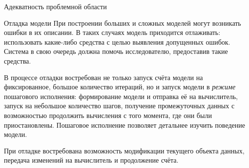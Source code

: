 \documentclass[a4paper,12pt]{extarticle}
\begin{document}
\begin{subsection}{Адекватность проблемной области}
    \begin{subsubsection}{Отладка модели}
        При построении больших и сложных моделей могут возникать ошибки в их описании. В таких случаях модель приходится отлаживать: использовать какие-либо средства с целью выявления допущенных ошибок. Система в свою очередь должна помочь исследователю, предоставив такие средства.
        
        В процессе отладки востребован не только запуск счёта модели на фиксированное, большое количество итераций, но и запуск модели в \textit{режиме} пошагового исполнения: формирование модели и отправка её на вычислитель, запуск на небольшое количество шагов, получение промежуточных данных с возможностью продолжить вычисления с того момента, где они были приостановлены. Пошаговое исполнение позволяет детальнее изучить поведение модели.
        
        При отладке востребована возможность модификации текущего объекта данных, передача изменений на вычислитель и продолжение счёта.
    \end{subsubsection}

\end{subsection}
\end{document}
